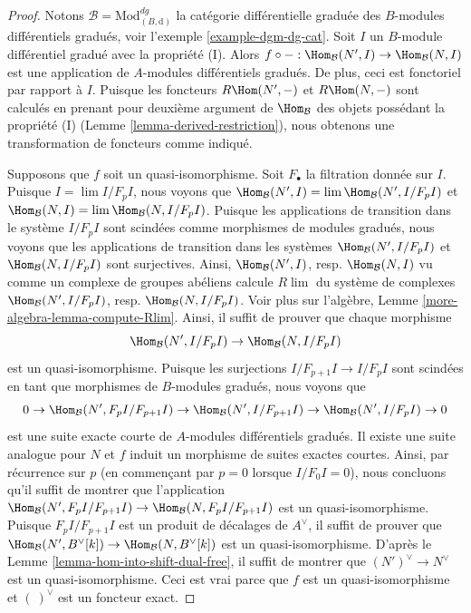 \begin{proof}
Notons $\mathcal{B} = \text{Mod}^{dg}_{(B, \text{d})}$ la catégorie
différentielle graduée des $B$-modules différentiels gradués, voir l’exemple
\ref{example-dgm-dg-cat}. Soit $I$ un $B$-module différentiel gradué avec la
propriété (I). Alors $f \circ - : \Hom_\mathcal{B}(N', I) \to \Hom_\mathcal{B}(N,
I)$ est une application de $A$-modules différentiels gradués. De plus, ceci est
fonctoriel par rapport à $I$. Puisque les foncteurs $ R\Hom(N', -)$ et $R\Hom(N,
-)$ sont calculés en prenant pour deuxième argument de $\Hom_\mathcal{B}$ des objets possédant la
propriété (I) (Lemme \ref{lemma-derived-restriction}), nous obtenons une
transformation de foncteurs comme indiqué.

\medskip\noindent
Supposons que $f$ soit un quasi-isomorphisme. Soit $F_\bullet$ la filtration
donnée sur $I$. Puisque $I = \lim I/F_pI$, nous voyons que $\Hom_\mathcal{B}(N', I)
= \lim \Hom_\mathcal{B}(N', I/F_pI)$ et $\Hom_\mathcal{B}(N, I) = \lim
\Hom_\mathcal{B}(N, I/F_pI)$. Puisque les applications de transition dans le
système $I/F_pI$ sont scindées comme morphismes de modules gradués, nous voyons que les
applications de transition dans les systèmes $\Hom_\mathcal{B}(N', I/F_pI)$ et
$\Hom_\mathcal{B}(N, I/F_pI)$ sont surjectives. Ainsi, $\Hom_\mathcal{B}(N', I)$,
resp. $\Hom_\mathcal{B}(N, I)$ vu comme un complexe de groupes abéliens calcule
$R\lim$ du système de complexes $\Hom_\mathcal{B}(N', I/F_pI)$, resp.
$\Hom_\mathcal{B}(N, I/F_pI)$.
Voir plus sur l'algèbre, Lemme \ref{more-algebra-lemma-compute-Rlim}. Ainsi, il
suffit de prouver que chaque morphisme
$$
\Hom_\mathcal{B}(N', I/F_pI) \to \Hom_\mathcal{B}(N, I/F_pI)
$$
est un quasi-isomorphisme. Puisque les surjections $I/F_{p + 1}I \to I/F_pI$ sont
scindées en tant que morphismes de $B$-modules gradués, nous voyons que
$$
0 \to \Hom_\mathcal{B}(N', F_pI/F_{p + 1}I) \to
\Hom_\mathcal{B}(N', I/F_{p + 1}I) \to
\Hom_\mathcal{B}(N', I/F_pI) \to 0
$$
est une suite exacte courte de $A$-modules différentiels gradués. Il existe une
suite analogue pour $N$ et $f$ induit un morphisme de suites exactes
courtes. Ainsi, par récurrence sur $p$ (en commençant par $p = 0$ lorsque $I/F_0I =
0$), nous concluons qu'il suffit de montrer que l'application
$\Hom_\mathcal{B}(N', F_pI/F_{p + 1}I) \to \Hom_\mathcal{B}(N, F_pI/F_{p + 1}I)$
est un quasi-isomorphisme. Puisque $F_pI/F_{p + 1}I$ est un produit de décalages
de $A^\vee$, il suffit de prouver que $\Hom_\mathcal{B}(N', B^\vee[k]) \to
\Hom_\mathcal{B}(N, B^\vee[k])$ est un quasi-isomorphisme. D'après le Lemme
\ref{lemma-hom-into-shift-dual-free}, il suffit de montrer que $(N')^\vee \to
N^\vee$ est un quasi-isomorphisme. Ceci est vrai parce que $f$ est un
quasi-isomorphisme et $(\ )^\vee$
est un foncteur exact.
\end{proof}

